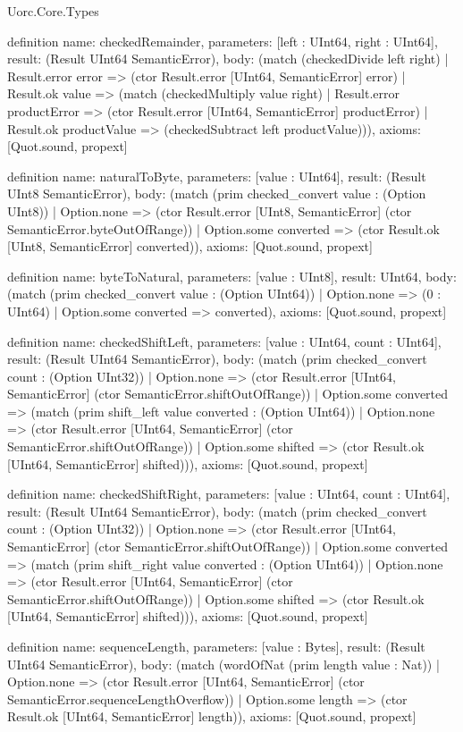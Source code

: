 \begin{lexlean}{Uorc.Core.Types}
\begin{semanticmodule}
definition{
  name: checkedRemainder,
  parameters: [left : UInt64, right : UInt64],
  result: (Result UInt64 SemanticError),
  body: (match (checkedDivide left right)
    | Result.error error => (ctor Result.error [UInt64, SemanticError] error)
    | Result.ok value => (match (checkedMultiply value right)
      | Result.error productError => (ctor Result.error [UInt64, SemanticError] productError)
      | Result.ok productValue => (checkedSubtract left productValue))),
  axioms: [Quot.sound, propext]
}

definition{
  name: naturalToByte,
  parameters: [value : UInt64],
  result: (Result UInt8 SemanticError),
  body: (match (prim checked_convert value : (Option UInt8))
    | Option.none => (ctor Result.error [UInt8, SemanticError] (ctor SemanticError.byteOutOfRange))
    | Option.some converted => (ctor Result.ok [UInt8, SemanticError] converted)),
  axioms: [Quot.sound, propext]
}

definition{
  name: byteToNatural,
  parameters: [value : UInt8],
  result: UInt64,
  body: (match (prim checked_convert value : (Option UInt64))
    | Option.none => (0 : UInt64)
    | Option.some converted => converted),
  axioms: [Quot.sound, propext]
}

definition{
  name: checkedShiftLeft,
  parameters: [value : UInt64, count : UInt64],
  result: (Result UInt64 SemanticError),
  body: (match (prim checked_convert count : (Option UInt32))
    | Option.none => (ctor Result.error [UInt64, SemanticError] (ctor SemanticError.shiftOutOfRange))
    | Option.some converted => (match (prim shift_left value converted : (Option UInt64))
      | Option.none => (ctor Result.error [UInt64, SemanticError] (ctor SemanticError.shiftOutOfRange))
      | Option.some shifted => (ctor Result.ok [UInt64, SemanticError] shifted))),
  axioms: [Quot.sound, propext]
}

definition{
  name: checkedShiftRight,
  parameters: [value : UInt64, count : UInt64],
  result: (Result UInt64 SemanticError),
  body: (match (prim checked_convert count : (Option UInt32))
    | Option.none => (ctor Result.error [UInt64, SemanticError] (ctor SemanticError.shiftOutOfRange))
    | Option.some converted => (match (prim shift_right value converted : (Option UInt64))
      | Option.none => (ctor Result.error [UInt64, SemanticError] (ctor SemanticError.shiftOutOfRange))
      | Option.some shifted => (ctor Result.ok [UInt64, SemanticError] shifted))),
  axioms: [Quot.sound, propext]
}

definition{
  name: sequenceLength,
  parameters: [value : Bytes],
  result: (Result UInt64 SemanticError),
  body: (match (wordOfNat (prim length value : Nat))
    | Option.none => (ctor Result.error [UInt64, SemanticError] (ctor SemanticError.sequenceLengthOverflow))
    | Option.some length => (ctor Result.ok [UInt64, SemanticError] length)),
  axioms: [Quot.sound, propext]
}


\end{semanticmodule}
\end{lexlean}
